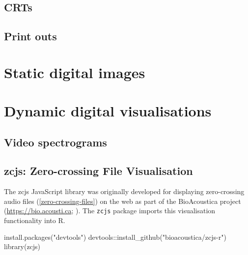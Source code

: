 \documentclass[
]{book}
\newenvironment{Shaded}{\begin{snugshade}}{\end{snugshade}}
\newcommand{\FunctionTok}[1]{\textcolor[rgb]{0.00,0.00,0.00}{#1}}
\newcommand{\NormalTok}[1]{#1}
\newcommand{\SpecialCharTok}[1]{\textcolor[rgb]{0.00,0.00,0.00}{#1}}
\newcommand{\StringTok}[1]{\textcolor[rgb]{0.31,0.60,0.02}{#1}}
\begin{document}
\hypertarget{crts}{%
\section{CRTs}\label{crts}}

\hypertarget{print-outs}{%
\section{Print outs}\label{print-outs}}

\hypertarget{static-digital-images}{%
\chapter{Static digital images}\label{static-digital-images}}

\hypertarget{dynamic-digital-visualisations}{%
\chapter{Dynamic digital visualisations}\label{dynamic-digital-visualisations}}

\hypertarget{video-spectrograms}{%
\section{Video spectrograms}\label{video-spectrograms}}

\hypertarget{zcjs-zero-crossing-file-visualisation}{%
\section{zcjs: Zero-crossing File Visualisation}\label{zcjs-zero-crossing-file-visualisation}}

The zcjs JavaScript library was originally developed for displaying zero-crossing audio files (\ref{zero-crossing-files}) on the web as part of the BioAcoustica project (\url{https://bio.acousti.ca}; \citet{baker2015bioacoustica}). The \texttt{zcjs} package \citep{zcjsr} imports this visualisation functionality into R.

\begin{Shaded}
\begin{Highlighting}[]
\FunctionTok{install.packages}\NormalTok{(}\StringTok{"devtools"}\NormalTok{)}
\NormalTok{devtools}\SpecialCharTok{::}\FunctionTok{install\_github}\NormalTok{(}\StringTok{"bioacoustica/zcjs{-}r"}\NormalTok{)}
\FunctionTok{library}\NormalTok{(zcjs)}
\end{Highlighting}
\end{Shaded}
\end{document}
